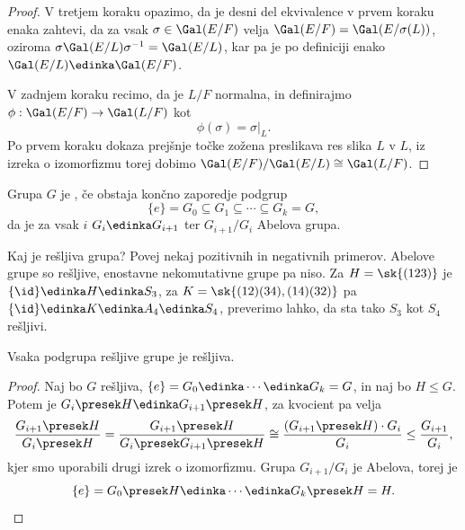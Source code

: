 \begin{proof}
  V tretjem koraku opazimo, da je desni del ekvivalence v prvem koraku enaka
  zahtevi, da za vsak $\sigma \in \Gal(E/F)$ velja $\Gal(E/F) =
  \Gal(E/\sigma(L))$, oziroma $\sigma \Gal(E/L) \sigma^{-1} = \Gal(E/L)$, kar pa
  je po definiciji enako $\Gal(E/L) \edinka \Gal(E/F)$.

  V zadnjem koraku recimo, da je $L/F$ normalna, in definirajmo $\phi :
  \Gal(E/F) \to \Gal(L/F)$ kot
  \[
	\phi(\sigma) = \left. \sigma \right|_L.
  \]
  Po prvem koraku dokaza prejšnje točke zožena preslikava res slika $L$ v $L$,
  iz izreka o izomorfizmu torej dobimo $\Gal(E/F) / \Gal(E/L) \cong \Gal(L/F)$.
\end{proof}



\begin{definicija}
  Grupa $G$ je , če obstaja končno zaporedje podgrup
  \[
	\{e\} = G_0 \subseteq G_1 \subseteq \cdots \subseteq G_k = G,
  \]
  da je za vsak $i$ $G_i \edinka G_{i+1}$ ter $G_{i+1} / G_i$ Abelova grupa.
\end{definicija}

\begin{vo}{Kaj je rešljiva grupa? Povej nekaj pozitivnih in negativnih primerov.}
  Abelove grupe so rešljive, enostavne nekomutativne grupe pa niso.
  Za $H = \sk{(1 2 3)}$ je $\{\id\} \edinka H \edinka S_3$, za $K = \sk{(1 2) (3
	4), (1 4)(3 2)}$ pa $\{\id\} \edinka K \edinka A_4 \edinka S_4$, preverimo
  lahko, da sta tako $S_3$ kot $S_4$ rešljivi.
\end{vo}

\begin{trditev}
  Vsaka podgrupa rešljive grupe je rešljiva.
\end{trditev}

\begin{proof}
  Naj bo $G$ rešljiva, $\{e\} = G_0 \edinka \cdots \edinka G_k = G$, in naj bo
  $H \le G$.
  Potem je $G_i \presek H \edinka G_{i+1} \presek H$, za kvocient pa velja
  \[
	\frac{G_{i+1} \presek H}{G_i \presek H} = \frac{G_{i+1} \presek H}{G_i
	  \presek G_{i+1} \presek H} \cong \frac{(G_{i+1} \presek H) \cdot G_i}{G_i}
	\le \frac{G_{i+1}}{G_i},
  \]
  kjer smo uporabili drugi izrek o izomorfizmu.
  Grupa $G_{i+1}/G_i$ je Abelova, torej je
  \[
	\{e\} = G_0 \presek H \edinka \cdots \edinka G_k \presek H = H.
  \]
\end{proof}

